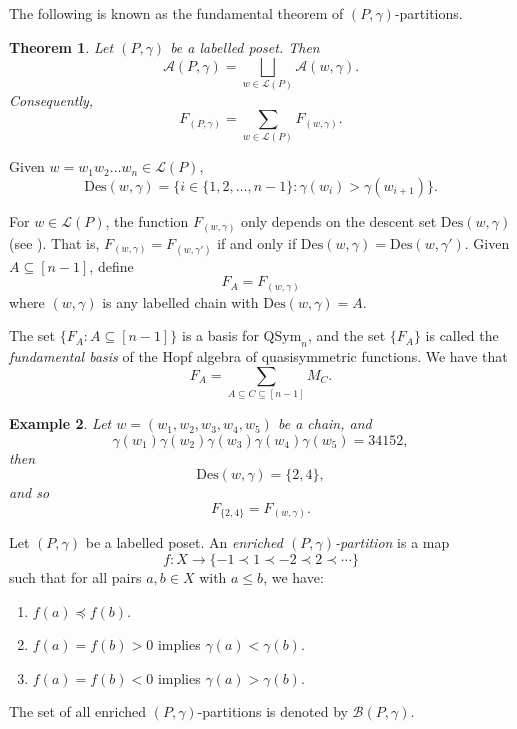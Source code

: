 \documentclass[11pt]{amsart}
\newtheorem{Theorem}{Theorem}[section]
\newtheorem{Example}[Theorem]{Example}
\numberwithin{equation}{section}
\newcommand{\QSym}{\mathrm{QSym}}
\newcommand{\Des}{\mathrm{Des}}
\begin{document}
 The following is known as the fundamental theorem of $(P,\gamma)$-partitions.

\begin{Theorem}\label{thm:ppar}\cite[Lemma 3.15.3]{EC} 
	Let $(P,\gamma)$ be a labelled poset. Then
	$$\mathcal{A}(P,\gamma)=\bigsqcup_{w\in\mathcal{L}(P)}\mathcal{A}(w,\gamma).$$
	Consequently,
	$$F_{(P,\gamma)}=\sum_{w\in\mathcal{L}(P)}F_{(w,\gamma)}.$$
\end{Theorem}

Given $w=w_1w_2\dots w_n\in \mathcal{L}(P)$, 
$$\Des(w,\gamma)=\{i\in \{1,2,\dots,n-1\}:\gamma(w_i)>\gamma(w_{i+1})\}.$$ 


For $w\in\mathcal{L}(P)$, the function $F_{(w,\gamma)}$ only depends on the descent set $\Des(w,\gamma)$  (see \cite[Section 2.2]{S97}). That is, $F_{(w,\gamma)} = F_{(w,\gamma')}$ if and only if $\Des(w,\gamma)=\Des(w,\gamma')$. Given $A\subseteq [n-1]$, define $$F_A=F_{(w,\gamma)}$$ where $(w,\gamma)$ is any labelled chain  with $\Des(w,\gamma)=A$.

The set $\{F_A: A\subseteq [n-1]\}$ is a basis for $\QSym_n$, and the set $\{F_A\}$ is called the \emph{fundamental basis} of the Hopf algebra of quasisymmetric functions.  We have that 
\[ F_A=\sum_{A\subseteq C \subseteq [n-1]} M_{C}.\]


\begin{Example}\label{ex:fund-to-gcf}
Let $w=(w_1,w_2,w_3,w_4, w_5)$ be a chain, and 
$$\gamma(w_1)\gamma(w_2)\gamma(w_3)\gamma(w_4)\gamma(w_5)=34152,$$ then 
$$\Des(w,\gamma)=\{2,4\},$$ and so 
$$F_{\{2,4\}}=F_{(w,\gamma)}.$$ 
\end{Example} 



Let $(P,\gamma)$ be a labelled poset. An \emph{enriched $(P,\gamma)$-partition} is a map $$f:X\to\{ -1\prec1\prec -2\prec 2 \prec \cdots \}$$ such that for all pairs $a,b\in X$ with $a\leq b$, we have:
\begin{enumerate}
	\item $f(a)\preceq f(b)$.
	\item $f(a)=f(b)>0$ implies $\gamma(a)<\gamma(b)$.
	\item $f(a)=f(b)<0$ implies $\gamma(a)>\gamma(b)$.
\end{enumerate}
The set of all enriched $(P,\gamma)$-partitions is denoted by $\mathcal{B}(P,\gamma)$. 
\end{document}
